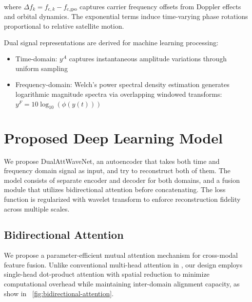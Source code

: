 \documentclass[10pt, conference]{IEEEtran}
\begin{document}
where $\Delta f_k = f_{\text{c},k} - f_{\text{c,gso}}$ captures carrier frequency offsets from Doppler effects and orbital dynamics. The exponential terms induce time-varying phase rotations proportional to relative satellite motion.

Dual signal representations are derived for machine learning processing:
\begin{itemize}
    \item Time-domain: $y^A$ captures instantaneous amplitude variations through uniform sampling
    \item Frequency-domain: Welch's power spectral density estimation generates logarithmic magnitude spectra via overlapping windowed transforms: $y^F = 10\log_{10}(\phi(y(t)))$
\end{itemize}

\section{Proposed Deep Learning Model}

We propose DualAttWaveNet, an autoencoder that takes both time and frequency domain signal as input, and try to reconstruct both of them. The model consists of separate encoder and decoder for both domains, and a fusion module that utilizes bidirectional attention before concatenating. The loss function is regularized with wavelet transform to enforce reconstruction fidelity across multiple scales.

\subsection{Bidirectional Attention}
\label{subsec:bi_attn}

We propose a parameter-efficient mutual attention mechanism for cross-modal feature fusion. Unlike conventional multi-head attention in \cite{vaswaniAttentionAllYou2017}, our design employs single-head dot-product attention with spatial reduction to minimize computational overhead while maintaining inter-domain alignment capacity, as show in  \figurename~\ref{fig:bidirectional-attention}.
\end{document}
